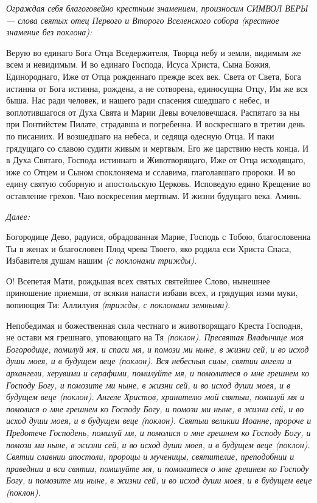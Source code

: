\medskip


\itshape Ограждая себя благоговейно крестным знамением, произносим СИМВОЛ ВЕРЫ — слова святых отец Первого и Второго Вселенского собора (крестное знамение без поклона): \normalfont{}


\medskip


Верую во единаго Бога Отца Вседержителя, Творца небу и земли, видимым же всем и невидимым. И во единаго Господа, Исуса Христа, Сына Божия, Единороднаго, Иже от Отца рожденнаго прежде всех век. Света от Света, Бога истинна от Бога истинна, рождена, а не сотворена, единосущна Отцу, Им же вся быша. Нас ради человек, и нашего ради спасения сшедшаго с небес, и воплотившагося от Духа Свята и Марии Девы вочеловечшася. Распятаго за ны при Понтийстем Пилате, страдавша и погребенна. И воскресшаго в третии день по писаниих. И возшедшаго на небеса, и седяща одесную Отца. И паки грядущаго со славою судити живым и мертвым, Его же царствию несть конца. И в Духа Святаго, Господа истиннаго и Животворящаго, Иже от Отца исходящаго, иже со Отцем и Сыном споклоняема и сславима, глаголавшаго пророки. И во едину святую соборную и апостольскую Церковь. Исповедую едино Крещение во оставление грехов. Чаю воскресения мертвым. И жизни будущаго века. Аминь.


\medskip


\itshape Далее: \normalfont{}


Богородице Дево, радуися, обрадованная Марие, Господь с Тобою, благословенна Ты в женах и благословен Плод чрева Твоего, яко родила еси Христа Спаса, Избавителя душам нашим \itshape (с поклонами трижды)\normalfont{}.


О! Всепетая Мати, рождьшая всех святых святейшее Слово, нынешнее приношение приемши, от всякия напасти избави всех, и грядущия изми муки, вопиющия Ти: Аллилуия \itshape (трижды, с поклонами земными)\normalfont{}.


Непобедимая и божественная сила честнаго и животворящаго Креста Господня, не остави мя грешнаго, уповающаго на Тя \itshape (поклон)\normalfont{}. Пресвятая Владычице моя Богородице, помилуй мя, и спаси мя, и помози ми ныне, в жизни сей, и во исход души моея, и в будущем веце \itshape (поклон)\normalfont{}. Вся небесныя силы, святии ангели и архангели, херувими и серафими, помилуйте мя, и помолитеся о мне грешнем ко Господу Богу, и помозите ми ныне, в жизни сей, и во исход души моея, и в будущем веце \itshape (поклон)\normalfont{}. Ангеле Христов, хранителю мой святыи, помилуй мя и помолися о мне грешнем ко Господу Богу, и помози ми ныне, в жизни сей, и во исход души моея, и в будущем веце \itshape (поклон)\normalfont{}. Святыи великии Иоанне, пророче и Предотече Господень, помилуй мя, и помолися о мне грешнем ко Господу Богу, и помози ми ныне, в жизни сей, и во исход души моея, и в будущем веце \itshape (поклон)\normalfont{}. Святии славнии апостоли, пророцы и мученицы, святителие, преподобнии и праведнии и вси святии, помилуйте мя, и помолитеся о мне грешнем ко Господу Богу, и помозите ми ныне, в жизни сей, и во исход души моея, и в будущем веце \itshape (поклон)\normalfont{}. 



